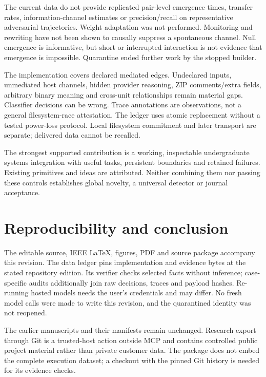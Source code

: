 \documentclass[conference]{IEEEtran}
\begin{document}
The current data do not provide replicated pair-level emergence times, transfer rates, information-channel estimates or precision/recall on representative adversarial trajectories. Weight adaptation was not performed. Monitoring and rewriting have not been shown to causally suppress a spontaneous channel. Null emergence is informative, but short or interrupted interaction is not evidence that emergence is impossible. Quarantine ended further work by the stopped builder.

The implementation covers declared mediated edges. Undeclared inputs, unmediated host channels, hidden provider reasoning, ZIP comments/extra fields, arbitrary binary meaning and cross-unit relationships remain material gaps. Classifier decisions can be wrong. Trace annotations are observations, not a general filesystem-race attestation. The ledger uses atomic replacement without a tested power-loss protocol. Local filesystem commitment and later transport are separate; delivered data cannot be recalled.

The strongest supported contribution is a working, inspectable undergraduate systems integration with useful tasks, persistent boundaries and retained failures. Existing primitives and ideas are attributed. Neither combining them nor passing these controls establishes global novelty, a universal detector or journal acceptance.

\section{Reproducibility and conclusion}\label{reproducibility-and-conclusion}

The editable source, IEEE LaTeX, figures, PDF and source package accompany this revision. The data ledger pins implementation and evidence bytes at the stated repository edition. Its verifier checks selected facts without inference; case-specific audits additionally join raw decisions, traces and payload hashes. Re-running hosted models needs the user's credentials and may differ. No fresh model calls were made to write this revision, and the quarantined identity was not reopened.

The earlier manuscripts and their manifests remain unchanged. Research export through Git is a trusted-host action outside MCP and contains controlled public project material rather than private customer data. The package does not embed the complete execution dataset; a checkout with the pinned Git history is needed for its evidence checks.
\end{document}
